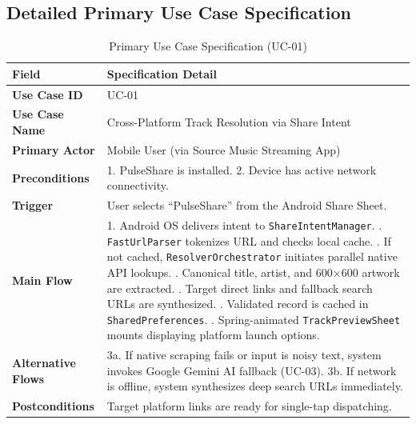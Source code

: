 \documentclass[12pt,a4paper]{report}
\begin{document}
\subsection{Detailed Primary Use Case Specification}
\begin{table}[H]
\centering
\caption{Primary Use Case Specification (UC-01)}
\label{tab:use_case_spec}
\begin{tabularx}{\textwidth}{lX}
\toprule
\textbf{Field} & \textbf{Specification Detail} \\
\midrule
\textbf{Use Case ID} & UC-01 \\
\textbf{Use Case Name} & Cross-Platform Track Resolution via Share Intent \\
\textbf{Primary Actor} & Mobile User (via Source Music Streaming App) \\
\textbf{Preconditions} & 1. PulseShare is installed. 2. Device has active network connectivity. \\
\textbf{Trigger} & User selects ``PulseShare'' from the Android Share Sheet. \\
\textbf{Main Flow} & 
1. Android OS delivers intent to \texttt{ShareIntentManager}. \newline
2. \texttt{FastUrlParser} tokenizes URL and checks local cache. \newline
3. If not cached, \texttt{ResolverOrchestrator} initiates parallel native API lookups. \newline
4. Canonical title, artist, and 600$\times$600 artwork are extracted. \newline
5. Target direct links and fallback search URLs are synthesized. \newline
6. Validated record is cached in \texttt{SharedPreferences}. \newline
7. Spring-animated \texttt{TrackPreviewSheet} mounts displaying platform launch options. \\
\textbf{Alternative Flows} & 
3a. If native scraping fails or input is noisy text, system invokes Google Gemini AI fallback (UC-03). \newline
3b. If network is offline, system synthesizes deep search URLs immediately. \\
\textbf{Postconditions} & Target platform links are ready for single-tap dispatching. \\
\bottomrule
\end{tabularx}
\end{table}

\end{document}
